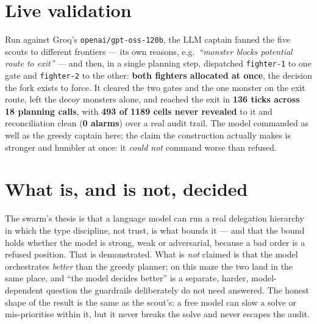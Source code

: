 \documentclass[11pt]{article}
\newcommand{\code}[1]{\texttt{#1}}
\begin{document}
\section{Live validation}

Run against Groq's \code{openai/gpt-oss-120b}, the LLM captain fanned the five scouts to
different frontiers --- its own reasons, e.g.\ \emph{``monster blocks potential route to
exit''} --- and then, in a single planning step, dispatched \code{fighter-1} to one gate
and \code{fighter-2} to the other: \textbf{both fighters allocated at once}, the decision
the fork exists to force. It cleared the two gates and the one monster on the exit route,
left the decoy monsters alone, and reached the exit in \textbf{136 ticks across 18
planning calls}, with \textbf{493 of 1189 cells never revealed} to it and reconciliation
clean (\textbf{0 alarms}) over a real audit trail. The model commanded as well as the
greedy captain here; the claim the construction actually makes is stronger and humbler at
once: it \emph{could not} command worse than refused.

\section{What is, and is not, decided}

The swarm's thesis is that a language model can run a real delegation hierarchy in which
the type discipline, not trust, is what bounds it --- and that the bound holds whether
the model is strong, weak or adversarial, because a bad order is a refused position. That
is demonstrated. What is \emph{not} claimed is that the model orchestrates \emph{better}
than the greedy planner; on this maze the two land in the same place, and ``the model
decides better'' is a separate, harder, model-dependent question the guardrails
deliberately do not need answered. The honest shape of the result is the same as the
scout's: a free model can slow a solve or mis-prioritise within it, but it never breaks
the solve and never escapes the audit.
\end{document}
